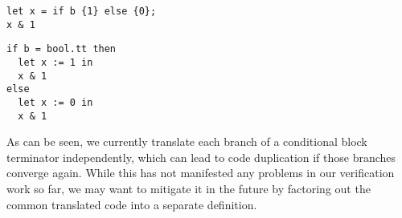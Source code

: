 \vspace{1em}\noindent\begin{minipage}{0.4\textwidth}
  \begin{verbatim}
let x = if b {1} else {0};
x & 1
  \end{verbatim}
\end{minipage}
\begin{minipage}{0.33\textwidth}
\end{minipage}
\begin{minipage}{0.3\textwidth}
  \begin{verbatim}
if b = bool.tt then
  let x := 1 in
  x & 1
else
  let x := 0 in
  x & 1
  \end{verbatim}
\end{minipage}\vspace{1em}

As can be seen, we currently translate each branch of a conditional block
terminator independently, which can lead to code duplication if those branches
converge again. While this has not manifested any problems in our verification
work so far, we may want to mitigate it in the future by factoring out the
common translated code into a separate definition.

